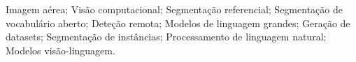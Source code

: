 \acresetall

\noindent Imagem aérea; Visão computacional; Segmentação referencial; Segmentação de vocabulário aberto; Deteção remota; Modelos de linguagem grandes; Geração de datasets; Segmentação de instâncias; Processamento de linguagem natural; Modelos visão-linguagem.